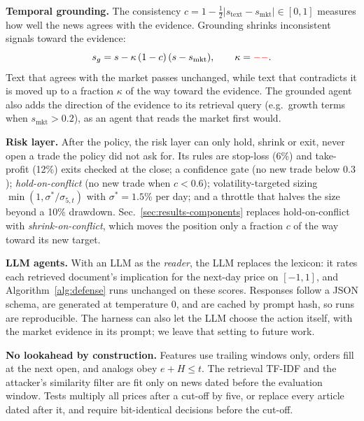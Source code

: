 \textbf{Temporal grounding.} The consistency $c=1-\frac{1}{2}\lvert s_{\mathrm{text}}-s_{\mathrm{mkt}}\rvert\in[0,1]$ measures how well the news agrees with the evidence. Grounding shrinks inconsistent signals toward the evidence:
\begin{equation}
s_g=s-\kappa\,(1-c)\,(s-s_{\mathrm{mkt}}),\qquad \kappa=\val{Kappa}.
\end{equation}
Text that agrees with the market passes unchanged, while text that contradicts it is moved up to a fraction $\kappa$ of the way toward the evidence. The grounded agent also adds the direction of the evidence to its retrieval query (e.g.\ growth terms when $s_{\mathrm{mkt}}>0.2$), as an agent that reads the market first would.

\textbf{Risk layer.} After the policy, the risk layer can only hold, shrink or exit, never open a trade the policy did not ask for. Its rules are stop-loss (6\%) and take-profit (12\%) exits checked at the close; a confidence gate (no new trade below $0.3$); \emph{hold-on-conflict} (no new trade when $c<0.6$); volatility-targeted sizing $\min(1,\sigma^{*}/\sigma_{5,t})$ with $\sigma^{*}=1.5\%$ per day; and a throttle that halves the size beyond a 10\% drawdown. Sec.~\ref{sec:results-components} replaces hold-on-conflict with \emph{shrink-on-conflict}, which moves the position only a fraction $c$ of the way toward its new target.

\textbf{LLM agents.} With an LLM as the \emph{reader}, the LLM replaces the lexicon: it rates each retrieved document's implication for the next-day price on $[-1,1]$, and Algorithm~\ref{alg:defense} runs unchanged on these scores. Responses follow a JSON schema, are generated at temperature 0, and are cached by prompt hash, so runs are reproducible. The harness can also let the LLM choose the action itself, with the market evidence in its prompt; we leave that setting to future work.

\textbf{No lookahead by construction.} Features use trailing windows only, orders fill at the next open, and analogs obey $e+H\le t$. The retrieval TF-IDF and the attacker's similarity filter are fit only on news dated before the evaluation window. Tests multiply all prices after a cut-off by five, or replace every article dated after it, and require bit-identical decisions before the cut-off.
